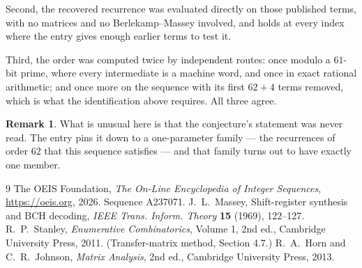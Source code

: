 \documentclass[11pt,a4paper]{article}
\theoremstyle{plain}
\theoremstyle{definition}
\newtheorem{remark}[theorem]{Remark}
\begin{document}
Second, the recovered recurrence was evaluated directly on those published terms, with no
matrices and no Berlekamp--Massey involved, and holds at every index where the entry gives
enough earlier terms to test it.

Third, the order was computed twice by independent routes: once modulo a $61$-bit prime, where
every intermediate is a machine word, and once in exact rational arithmetic; and once more on
the sequence with its first $62+4$ terms removed, which is what the identification above
requires. All three agree.

\begin{remark}
What is unusual here is that the conjecture's statement was never read. The entry pins it down
to a one-parameter family --- the recurrences of order $62$ that this sequence satisfies
--- and that family turns out to have exactly one member.
\end{remark}

\begin{thebibliography}{9}
 The OEIS Foundation, \emph{The On-Line Encyclopedia of Integer
Sequences}, \url{https://oeis.org}, 2026. Sequence A237071.
 J.~L.~Massey, Shift-register synthesis and BCH decoding, \emph{IEEE
Trans. Inform. Theory} \textbf{15} (1969), 122--127.
 R.~P.~Stanley, \emph{Enumerative Combinatorics}, Volume 1, 2nd ed.,
Cambridge University Press, 2011. (Transfer-matrix method, Section 4.7.)
 R.~A.~Horn and C.~R.~Johnson, \emph{Matrix Analysis}, 2nd ed., Cambridge
University Press, 2013.
\end{thebibliography}
\end{document}
